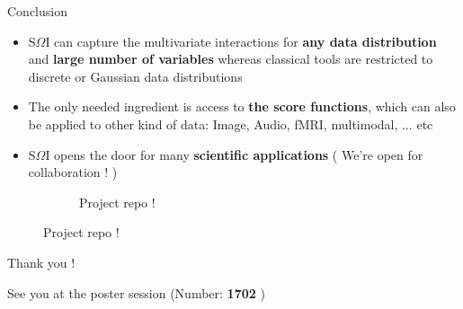 \documentclass{beamer}
\begin{document}
\begin{frame}{Conclusion}
\begin{itemize}
    
    

    \item S$\Omega$I can capture the multivariate interactions for \textbf{any data distribution} and \textbf{large number of variables} whereas classical tools are restricted to discrete or Gaussian data distributions 
    
    
    \item The only needed ingredient is access to \textbf{the score functions}, which can also be applied to other kind of data: Image, Audio, fMRI, multimodal, $ \dots $ etc
    
    \item S$\Omega$I opens the door for many 
    \textbf{scientific applications} ( We're open for collaboration ! )
  
\end{itemize}

 \begin{figure}
    \begin{subfigure}[]{0.70\textwidth}
    \hspace{5cm}
    \end{subfigure}
    \begin{subfigure}[]{0.25\textwidth}
    \color{black}
    \centering
       {}
      \caption*{Project repo !}
    \end{subfigure}%
  \end{figure}
\end{frame}


\begin{frame}{}
\centering
\huge
Thank you !

\vspace{3cm}
\normalsize
\centering
 See you at the poster session (Number: \textbf{1702} )

 
    
\end{frame}
\end{document}
